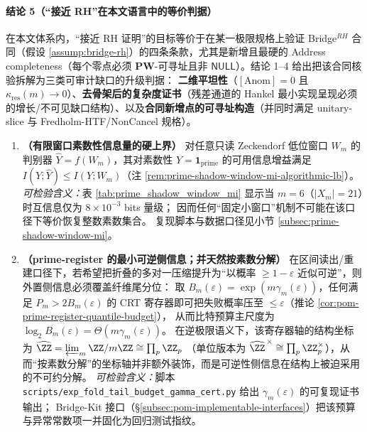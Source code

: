 \paragraph{结论 5（“接近 RH”在本文语言中的等价判据）}
在本文体系内，“接近 RH 证明”的目标等价于在某一极限规格上验证 Bridge\(^{RH}\) 合同（假设 \ref{assump:bridge-rh}）的四条条款，尤其是新增且最硬的 Address completeness（每个零点必须 \(\mathbf{PW}\)-可寻址且非 \(\mathsf{NULL}\)）。结论 1--4 给出把该合同核验拆解为三类可审计缺口的升级判据：
\textbf{二维平坦性}（\([\mathrm{Anom}]=0\) 且 \(\kappa_{\mathrm{res}}(m)\to 0\)）、\textbf{去骨架后的复杂度证书}（残差通道的 Hankel 最小实现呈现必须的增长/不可见缺口结构）、以及\textbf{合同新增点的可寻址构造}（并同时满足 unitary-slice 与 Fredholm-HTF/NonCancel 规格）。
\begin{enumerate}
  \item \textbf{（有限窗口素数性信息量的硬上界）}
  对任意只读 Zeckendorf 低位窗口 \(W_m\) 的判别器 \(\widehat Y=f(W_m)\)，其对素数性 \(Y=\mathbf{1}_{\mathrm{prime}}\) 的可用信息增益满足
  \(I(Y;\widehat Y)\le I(Y;W_m)\)（注 \ref{rem:prime-shadow-window-mi-algorithmic-lb}）。
  \emph{可检验含义：}表 \ref{tab:prime_shadow_window_mi} 显示当 \(m=6\)（\(|X_m|=21\)）时互信息仅为 \(8\times 10^{-3}\) bits 量级；
  因而任何“固定小窗口”机制不可能在该口径下等价恢复整数素数集合。
  复现脚本与数据口径见小节 \ref{subsec:prime-shadow-window-mi}。

  \item \textbf{（prime-register 的最小可逆侧信息；并天然按素数分解）}
  在区间读出/重建口径下，若希望把折叠的多对一压缩提升为“以概率 \(\ge 1-\varepsilon\) 近似可逆”，则外置侧信息必须覆盖纤维尾分位：
  取 \(B_m(\varepsilon)=\exp(m\gamma_m(\varepsilon))\)，任何满足 \(P_m>2B_m(\varepsilon)\) 的 CRT 寄存器即可把失败概率压至 \(\le\varepsilon\)（推论 \ref{cor:pom-prime-register-quantile-budget}），
  从而比特预算主尺度为 \(\log_2 B_m(\varepsilon)=\Theta(m\gamma_m(\varepsilon))\)。
  在逆极限语义下，该寄存器轴的结构坐标为
  \(
  \widehat{\ZZ}=\varprojlim_m \ZZ/m\ZZ\cong \prod_{p}\ZZ_p
  \)
  （单位版本为 \(\widehat{\ZZ}^{\,\times}\cong\prod_p\ZZ_p^{\times}\)），从而“按素数分解”的坐标轴并非额外装饰，而是可逆性侧信息在结构上被迫采用的不可约分解。
  \emph{可检验含义：}脚本 \texttt{scripts/exp\_fold\_tail\_budget\_gamma\_cert.py} 给出 \(\gamma_m(\varepsilon)\) 的可复现证书输出；
  Bridge-Kit 接口（\S\ref{subsec:pom-implementable-interfaces}）把该预算与异常常数项一并固化为回归测试指纹。


\end{enumerate}
